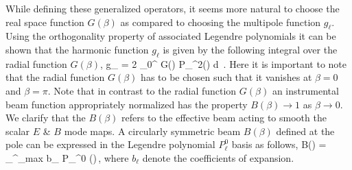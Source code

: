 While defining these generalized operators, it seems more natural to choose the real space function $G(\beta)$ as compared to choosing the multipole function $g_{\ell}$. Using the orthogonality property of associated Legendre polynomials it can be shown that the harmonic function $g_{\ell}$ is given by the following integral over the radial function $G(\beta)$,
%
\beq
g_{\ell} = 2 \pi {} \int _{0}^{\pi} G(\beta) P_{\ell}^{2}(\cos{\beta}) d\cos{\beta} \,. \label{eq:gb2bl}
\eeq
%
Here it is important to note that the radial function $G(\beta)$ has to be chosen such that it vanishes at $\beta=0$ and $\beta=\pi$. 
Note that in contrast to the radial function $G(\beta)$ an instrumental beam function appropriately normalized has the property $B(\beta) \rightarrow 1$ as $\beta \rightarrow 0$. We clarify that the $B(\beta)$ refers to the effective beam acting to smooth the scalar $E$ \& $B$ mode maps. A circularly symmetric beam $B(\beta)$ defined at the pole can be expressed in the Legendre polynomial $P_{\ell}^0$ basis as follows,
%
\beq
B(\beta) = \sum_{}^{\ell_{\rm max}}  b_{\ell} P_{\ell}^{0} (\cos{\beta})\,,
\eeq
%
where $b_{\ell}$ denote the coefficients of expansion.
%
